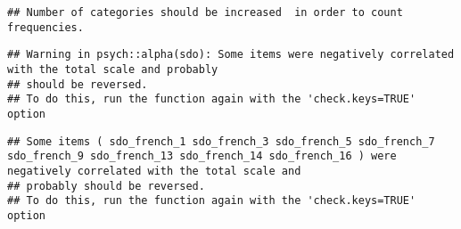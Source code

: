 \documentclass[
]{article}
\begin{document}
\begin{verbatim}
## Number of categories should be increased  in order to count frequencies.
\end{verbatim}

\begin{verbatim}
## Warning in psych::alpha(sdo): Some items were negatively correlated with the total scale and probably 
## should be reversed.  
## To do this, run the function again with the 'check.keys=TRUE' option
\end{verbatim}

\begin{verbatim}
## Some items ( sdo_french_1 sdo_french_3 sdo_french_5 sdo_french_7 sdo_french_9 sdo_french_13 sdo_french_14 sdo_french_16 ) were negatively correlated with the total scale and 
## probably should be reversed.  
## To do this, run the function again with the 'check.keys=TRUE' option
\end{verbatim}
\end{document}

